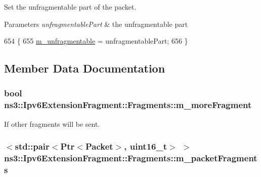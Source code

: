 Set the unfragmentable part of the packet. 


\begin{DoxyParams}{Parameters}
{\em unfragmentable\+Part} & the unfragmentable part \\
\hline
\end{DoxyParams}

\begin{DoxyCode}
654 \{
655   \hyperlink{classns3_1_1Ipv6ExtensionFragment_1_1Fragments_a984aec2a43c2fb5a909637fc25ace14d}{m\_unfragmentable} = unfragmentablePart;
656 \}
\end{DoxyCode}


\subsection{Member Data Documentation}
\subsubsection[{\texorpdfstring{m\+\_\+more\+Fragment}{m_moreFragment}}]{\setlength{\rightskip}{0pt plus 5cm}bool ns3\+::\+Ipv6\+Extension\+Fragment\+::\+Fragments\+::m\+\_\+more\+Fragment\hspace{0.3cm}{\ttfamily [private]}}\hypertarget{classns3_1_1Ipv6ExtensionFragment_1_1Fragments_a9264a9faedafcd55c98f5a9408ec23d9}{}\label{classns3_1_1Ipv6ExtensionFragment_1_1Fragments_a9264a9faedafcd55c98f5a9408ec23d9}


If other fragments will be sent. 

\subsubsection[{\texorpdfstring{m\+\_\+packet\+Fragments}{m_packetFragments}}]{$<$std\+::pair$<${\bf Ptr}$<${\bf Packet}$>$, uint16\+\_\+t$>$ $>$ ns3\+::\+Ipv6\+Extension\+Fragment\+::\+Fragments\+::m\+\_\+packet\+Fragments\hspace{0.3cm}{\ttfamily [private]}}\hypertarget{classns3_1_1Ipv6ExtensionFragment_1_1Fragments_a247578d26bb68bfcdff2014cf8d1c5c2}{}\label{classns3_1_1Ipv6ExtensionFragment_1_1Fragments_a247578d26bb68bfcdff2014cf8d1c5c2}


